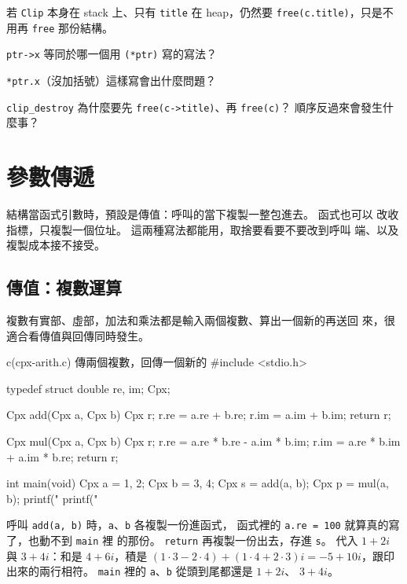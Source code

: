若 \texttt{Clip} 本身在 stack 上、只有 \texttt{title} 在 heap，仍然要
\texttt{free(c.title)}，只是不用再 \texttt{free} 那份結構。

\begin{drills}[label=drills:struct-pointer]
\item \texttt{ptr->x} 等同於哪一個用 \texttt{(*ptr)} 寫的寫法？
\item \texttt{*ptr.x}（沒加括號）這樣寫會出什麼問題？
\item \texttt{clip\_destroy} 為什麼要先 \texttt{free(c->title)}、再
\texttt{free(c)}？ 順序反過來會發生什麼事？
\end{drills}

\section{參數傳遞}
\label{sec:struct-params}

結構當函式引數時，預設是傳值：呼叫的當下複製一整包進去。 函式也可以
改收指標，只複製一個位址。 這兩種寫法都能用，取捨要看要不要改到呼叫
端、以及複製成本接不接受。

\subsection{傳值：複數運算}

複數有實部、虛部，加法和乘法都是輸入兩個複數、算出一個新的再送回
來，很適合看傳值與回傳同時發生。

\begin{example}{c}{(cpx-arith.c) 傳兩個複數，回傳一個新的}
#include <stdio.h>

typedef struct {
    double re, im;
} Cpx;

Cpx add(Cpx a, Cpx b) {
    Cpx r;
    r.re = a.re + b.re;
    r.im = a.im + b.im;
    return r;
}

Cpx mul(Cpx a, Cpx b) {
    Cpx r;
    r.re = a.re * b.re - a.im * b.im;
    r.im = a.re * b.im + a.im * b.re;
    return r;
}

int main(void) {
    Cpx a = {1, 2};
    Cpx b = {3, 4};
    Cpx s = add(a, b);
    Cpx p = mul(a, b);
    printf("%
    printf("%
}
\end{example}


呼叫 \texttt{add(a, b)} 時，\texttt{a}、\texttt{b} 各複製一份進函式，
函式裡的 \texttt{a.re = 100} 就算真的寫了，也動不到 \texttt{main} 裡
的那份。 \texttt{return} 再複製一份出去，存進 \texttt{s}。 代入
$1 + 2i$ 與 $3 + 4i$：和是 $4 + 6i$，積是 $(1 \cdot 3 - 2 \cdot 4) +
(1 \cdot 4 + 2 \cdot 3)i = -5 + 10i$，跟印出來的兩行相符。
\texttt{main} 裡的 \texttt{a}、\texttt{b} 從頭到尾都還是 $1 + 2i$、
$3 + 4i$。

